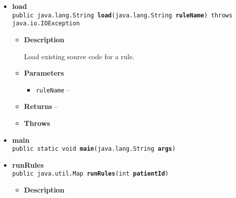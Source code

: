 {{{{\begin{itemize}
{\begin{itemize}
{Get all currently defined rules.
}
\item{{\bf  Returns} -- 
 
}%
\end{itemize}
}%
\item{ 
\hypertarget{org.openmrs.module.dssmodule.DSSRuleService.load(java.lang.String)}{{\bf  load}\\}
\texttt{public java.lang.String\ {\bf  load}(\texttt{java.lang.String} {\bf  ruleName}) throws java.io.IOException
\label{org.openmrs.module.dssmodule.DSSRuleService.load(java.lang.String)}}%
\begin{itemize}
\item{
{\bf  Description}

Load existing source code for a rule.
}
\item{
{\bf  Parameters}
  \begin{itemize}
   \item{
\texttt{ruleName} -- }
  \end{itemize}
}%
\item{{\bf  Returns} -- 
 
}%
\item{{\bf  Throws}
}%
\end{itemize}
}%
\item{ 
\hypertarget{org.openmrs.module.dssmodule.DSSRuleService.main(java.lang.String[])}{{\bf  main}\\}
\texttt{public static void\ {\bf  main}(\texttt{java.lang.String\lbrack \rbrack } {\bf  args})
\label{org.openmrs.module.dssmodule.DSSRuleService.main(java.lang.String[])}}%
}%
\item{ 
\hypertarget{org.openmrs.module.dssmodule.DSSRuleService.runRules(int)}{{\bf  runRules}\\}
\texttt{public java.util.Map\ {\bf  runRules}(\texttt{int} {\bf  patientId})
\label{org.openmrs.module.dssmodule.DSSRuleService.runRules(int)}}%
\begin{itemize}
\item{
{\bf  Description}

}
\end{itemize}}
\end{itemize}}}}}
